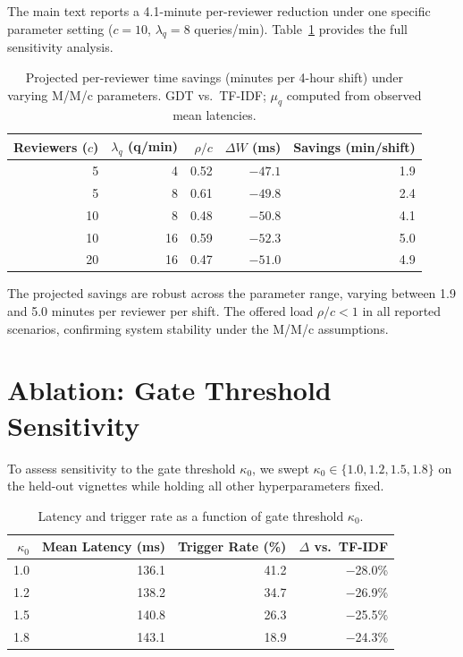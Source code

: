 \documentclass[11pt]{article}
\begin{document}
The main text reports a 4.1-minute per-reviewer reduction under one specific
parameter setting ($c{=}10$, $\lambda_q{=}8$ queries/min). Table~\ref{tab:queueing_sensitivity}
provides the full sensitivity analysis.

\begin{table}[h]
\centering
\caption{Projected per-reviewer time savings (minutes per 4-hour shift) under
varying M/M/c parameters. GDT vs.\ TF-IDF; $\mu_q$ computed from observed
mean latencies.}
\label{tab:queueing_sensitivity}
\begin{tabular}{rrrrr}
\toprule
\textbf{Reviewers ($c$)} & \textbf{$\lambda_q$ (q/min)} & \textbf{$\rho/c$} & \textbf{$\Delta W$ (ms)} & \textbf{Savings (min/shift)} \\
\midrule
5  & 4  & 0.52 & $-47.1$ & 1.9 \\
5  & 8  & 0.61 & $-49.8$ & 2.4 \\
10 & 8  & 0.48 & $-50.8$ & 4.1 \\
10 & 16 & 0.59 & $-52.3$ & 5.0 \\
20 & 16 & 0.47 & $-51.0$ & 4.9 \\
\bottomrule
\end{tabular}
\end{table}

The projected savings are robust across the parameter range, varying between 1.9
and 5.0 minutes per reviewer per shift. The offered load $\rho/c < 1$ in all
reported scenarios, confirming system stability under the M/M/c assumptions.

\section{Ablation: Gate Threshold Sensitivity}
\label{sec:gate_sensitivity}

To assess sensitivity to the gate threshold $\kappa_0$, we swept $\kappa_0 \in
\{1.0, 1.2, 1.5, 1.8\}$ on the held-out vignettes while holding all other
hyperparameters fixed.

\begin{table}[h]
\centering
\caption{Latency and trigger rate as a function of gate threshold $\kappa_0$.}
\label{tab:gate_sensitivity}
\begin{tabular}{rrrr}
\toprule
$\kappa_0$ & \textbf{Mean Latency (ms)} & \textbf{Trigger Rate (\%)} & \textbf{$\Delta$ vs.\ TF-IDF} \\
\midrule
1.0 & 136.1 & 41.2 & $-$28.0\% \\
1.2 & 138.2 & 34.7 & $-$26.9\% \\
1.5 & 140.8 & 26.3 & $-$25.5\% \\
1.8 & 143.1 & 18.9 & $-$24.3\% \\
\bottomrule
\end{tabular}
\end{table}
\end{document}
